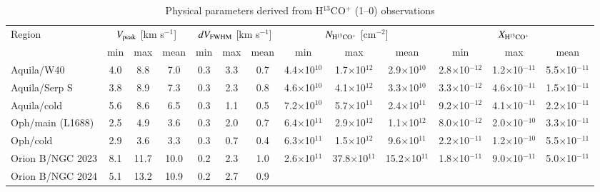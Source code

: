 \begin{table*}
\centering
\begin{threeparttable}
\tiny
\caption{Physical parameters derived from H$^{13}$CO$^{+}$ (1--0) observations \label{table:param_h13cop}}
\begin{tabular}{|l|ccc|ccc|ccc|ccc|}
\hline
Region &  \multicolumn{3}{|c|}{$V_{\rm peak}$ [km s$^{-1}$] }   & \multicolumn{3}{|c|}{$dV_{\rm FWHM}$ [km s$^{-1}$] } & \multicolumn{3}{|c|}{$N_{\rm H^{13}CO^+}$ [cm$^{-2}$]}  &  \multicolumn{3}{|c|}{$X_{\rm H^{13}CO^+}$}   \\
            & min  & max  & mean &    min  & max  & mean &  min  & max  & mean   &   min  & max  & mean      \\
\hline
Aquila/W40                  &  4.0 & 8.8 & 7.0  & 0.3    &  3.3  & 0.7
                                    	&  4.4$\times$10$^{10}$  &  1.7$\times$10$^{12}$ & 2.9$\times$10$^{10}$   &   2.8$\times$10$^{-12}$ &  1.2$\times$10$^{-11}$ &   5.5$\times$10$^{-11}$  \\
Aquila/Serp S               &  3.8 & 8.9  & 7.3  & 0.3    &  2.3 & 0.8
                                    	&  4.6$\times$10$^{10}$  &  4.1$\times$10$^{12}$ & 3.3$\times$10$^{10}$  &   3.3$\times$10$^{-12}$ &  4.6$\times$10$^{-11}$ &   1.5$\times$10$^{-11}$  \\
Aquila/cold                  &   5.6 & 8.6  & 6.5  & 0.3    &  1.1  & 0.5
                                    	&  7.2$\times$10$^{10}$  &  5.7$\times$10$^{11}$ & 2.4$\times$10$^{11}$   &   9.2$\times$10$^{-12}$ &  4.1$\times$10$^{-11}$ &   2.2$\times$10$^{-11}$  \\
Oph/main (L1688)                     &  2.5 & 4.9  & 3.6  & 0.3    &  2.0  & 0.7
                                    	&   6.4$\times$10$^{11}$  &   2.9$\times$10$^{12}$ &  1.1$\times$10$^{12}$   &   8.0$\times$10$^{-12}$ &   2.0$\times$10$^{-10}$  &   3.3$\times$10$^{-11}$    \\
Oph/cold                     &  2.9 & 3.6  & 3.3  &   0.3  & 0.7  & 0.4
                                    	&  6.3$\times$10$^{11}$  &   1.5$\times$10$^{12}$ &  9.6$\times$10$^{11}$   &   2.2$\times$10$^{-11}$ &   1.2$\times$10$^{-10}$  &   5.5$\times$10$^{-11}$    \\
Orion B/NGC 2023       &   8.1 & 11.7  & 10.0  & 0.2    & 2.3  & 1.0
                                    	&   2.6$\times$10$^{11}$  &  37.8$\times$10$^{11}$ & 15.2$\times$10$^{11}$ &  1.8$\times$10$^{-11}$  &  9.0$\times$10$^{-11}$  &   5.0$\times$10$^{-11}$   \\
Orion B/NGC 2024       &  5.1 & 13.2  & 10.9  & 0.2   &  2.7  & 0.9

\end{tabular}
\end{threeparttable}
\end{table*}
